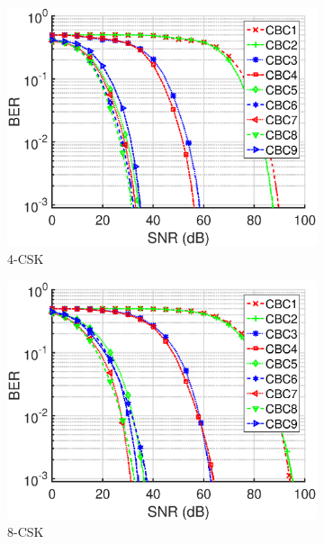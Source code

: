 \documentclass[10pt,letterpaper]{article}
\begin{document}
\begin{figure}[t]
	\centering
		\begin{subfigure}{0.49\textwidth}
		\centering
			\includegraphics[trim={0.1in 0.0in 0.5in 0.3in}, clip=true, width=\textwidth]{M04_4-CSK_BERvsSNR_NL.eps}
			\caption{4-CSK}
			\label{fig4SNR_NL}
		\end{subfigure}
		\hfill
		\begin{subfigure}{0.49\textwidth}
		\centering
			\includegraphics[trim={0.1in 0.0in 0.5in 0.3in}, clip=true, width=\textwidth]{M08_8-CSK_BERvsSNR_NL.eps}
			\caption{8-CSK}
			\label{fig8SNR_NL}
		\end{subfigure}
		\vfill
		\begin{subfigure}{0.49\textwidth}

\end{subfigure}
\end{figure}
\end{document}
